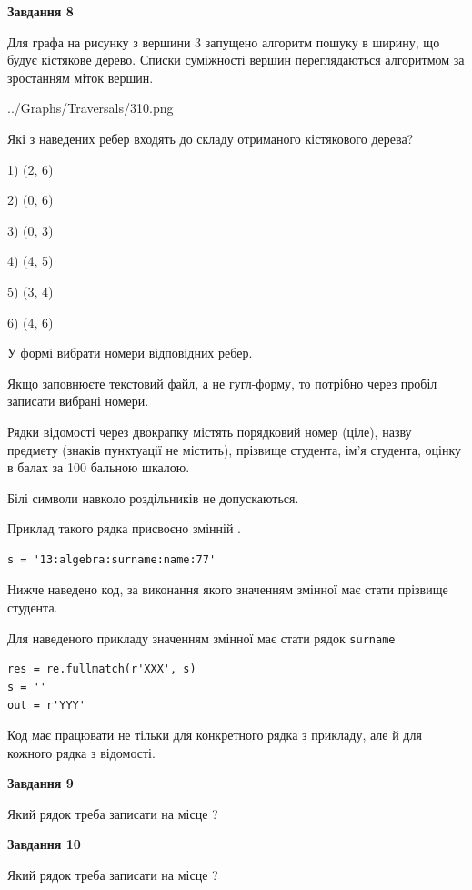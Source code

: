 \documentclass[12pt, ukrainian]{article}
\def\code#1{\Verb!#1!}
\begin{document}
{\begin {large}
{\begin {center}\textbf{Завдання 8}\end {center}}\par
Для графа на рисунку з вершини 3 запущено алгоритм пошуку в ширину, що будує кістякове дерево. Списки суміжності вершин переглядаються алгоритмом за зростанням міток вершин.\par
\begin{center}
	{../Graphs/Traversals/310.png}
\end{center}
\par Які з наведених ребер входять до складу отриманого кістякового дерева?\par
1) (2, 6)\par
2) (0, 6)\par
3) (0, 3)\par
4) (4, 5)\par
5) (3, 4)\par
6) (4, 6)\par
{\vskip 15pt} У формі вибрати номери відповідних ребер.


Якщо заповнюєте текстовий файл, а не гугл-форму, то потрібно через пробіл записа\-ти вибрані номери.\par
\newpage


Рядки відомості через двокрапку містять порядковий номер (ціле), назву предмету (знаків пунктуації не містить), прізвище студента, ім'я студента, оцінку в балах за 100 бальною шкалою.

Білі символи навколо роздільників не допускаються.

Приклад такого рядка присвоєно змінній .



\begin{verbatim}
s = '13:algebra:surname:name:77'
\end{verbatim}


Нижче наведено код, за виконання якого значенням змінної  має стати прізвище студента.

Для наведеного прикладу значенням змінної  має стати рядок \code{surname}



\begin{verbatim}
res = re.fullmatch(r'XXX', s)
s = ''
out = r'YYY'
\end{verbatim}


Код має працювати не тільки для конкретного рядка з прикладу, але й для кожного рядка з відомості.

{\begin {center}\textbf{Завдання 9}\end {center}}\par
Який рядок треба записати на місце  ?\par
\vspace{5mm}


{\begin {center}\textbf{Завдання 10}\end {center}}\par
Який рядок треба записати на місце  ?\par


\newpage


\end {large}}
\end{document}
